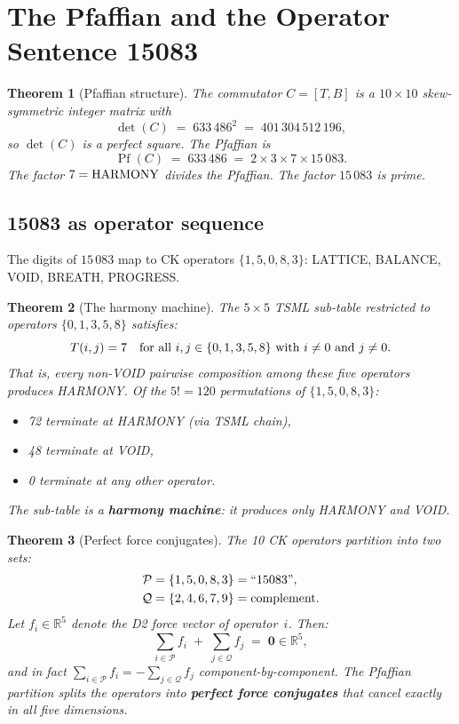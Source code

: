 \documentclass[11pt]{article}
\newtheorem{theorem}{Theorem}[section]
\theoremstyle{definition}
\theoremstyle{remark}
\begin{document}
\section{The Pfaffian and the Operator Sentence 15083}
\label{sec:pfaffian}

\begin{theorem}[Pfaffian structure]
\label{thm:pfaffian}
The commutator $C = [T,B]$ is a $10\times 10$ skew-symmetric integer matrix
with
\[
  \det(C) \;=\; 633\,486^2 \;=\; 401\,304\,512\,196,
\]
so $\det(C)$ is a perfect square.  The Pfaffian is
\[
  \operatorname{Pf}(C) \;=\; 633\,486 \;=\; 2 \times 3 \times 7 \times 15\,083.
\]
The factor $7 = \textup{HARMONY}$ divides the Pfaffian.  The factor $15\,083$
is prime.
\end{theorem}

\subsection{15083 as operator sequence}

The digits of $15\,083$ map to CK operators $\{1, 5, 0, 8, 3\}$:
LATTICE, BALANCE, VOID, BREATH, PROGRESS.

\begin{theorem}[The harmony machine]
\label{thm:harmony-machine}
The $5 \times 5$ TSML sub-table restricted to operators $\{0,1,3,5,8\}$
satisfies:
\[
  T(i,j) = 7 \quad\textup{for all } i,j \in \{0,1,3,5,8\} \textup{ with }
  i \neq 0 \textup{ and } j \neq 0.
\]
That is, every non-VOID pairwise composition among these five operators produces
HARMONY.  Of the $5! = 120$ permutations of $\{1,5,0,8,3\}$:
\begin{itemize}[nosep]
  \item 72 terminate at HARMONY (via TSML chain),
  \item 48 terminate at VOID,
  \item 0 terminate at any other operator.
\end{itemize}
The sub-table is a \textbf{harmony machine}: it produces only HARMONY and VOID.
\end{theorem}

\begin{theorem}[Perfect force conjugates]
\label{thm:conjugates}
The 10 CK operators partition into two sets:
\begin{align}
  \mathcal{P} &= \{1, 5, 0, 8, 3\} = \textup{``15083''}, \\
  \mathcal{Q} &= \{2, 4, 6, 7, 9\} = \textup{complement}.
\end{align}
Let $f_i \in \mathbb{R}^5$ denote the D2 force vector of operator~$i$.
Then:
\[
  \sum_{i \in \mathcal{P}} f_i \;+\; \sum_{j \in \mathcal{Q}} f_j
  \;=\; \mathbf{0} \in \mathbb{R}^5,
\]
and in fact $\sum_{i \in \mathcal{P}} f_i = -\sum_{j \in \mathcal{Q}} f_j$
component-by-component.  The Pfaffian partition splits the operators into
\textbf{perfect force conjugates} that cancel exactly in all five dimensions.
\end{theorem}
\end{document}
